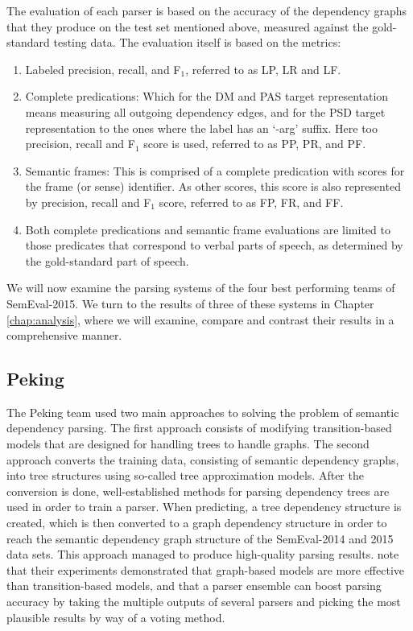 The evaluation of each parser is based on the accuracy of the dependency graphs that they produce on the test set mentioned above, measured against the gold-standard testing data. The evaluation itself is based on the metrics: 

\begin{enumerate}
    \item Labeled precision, recall, and F$_1$, referred to as LP, LR and LF.
    \item Complete predications: Which for the DM and PAS target representation means measuring all outgoing dependency edges, and for the PSD target representation to the ones where the label has an `-arg' suffix. Here too precision, recall and F$_1$ score is used, referred to as PP, PR, and PF.
    \item Semantic frames: This is comprised of a complete predication with scores for the frame (or sense) identifier. As other scores, this score is also represented by precision, recall and F$_1$ score, referred to as FP, FR, and FF.
    \item Both complete predications and semantic frame evaluations are limited to those predicates that correspond to verbal parts of speech, as determined by the gold-standard part of speech.
\end{enumerate}

We will now examine the parsing systems of the four best performing teams of SemEval-2015. We turn to the results of three of these systems in Chapter \ref{chap:analysis}, where we will examine, compare and contrast their results in a comprehensive manner.

\subsection{Peking} 

The Peking team used two main approaches to solving the problem of semantic dependency parsing. The first approach consists of modifying transition-based models that are designed for handling trees to handle graphs. The second approach converts the training data, consisting of semantic dependency graphs, into tree structures using so-called tree approximation models. After the conversion is done, well-established methods for parsing dependency trees are used in order to train a parser. When predicting, a tree dependency structure is created, which is then converted to a graph dependency structure in order to reach the semantic dependency graph structure of the SemEval-2014 and 2015 data sets. This approach managed to produce high-quality parsing results.  note that their experiments demonstrated that graph-based models are more effective than transition-based models, and that a parser ensemble can boost parsing accuracy by taking the multiple outputs of several parsers and picking the most plausible results by way of a voting method.

